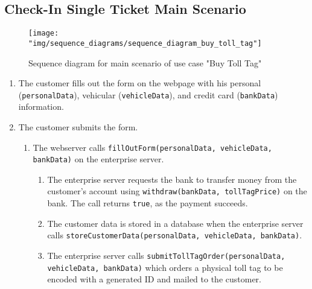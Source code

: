 \subsection{Check-In Single Ticket Main Scenario}

\begin{figure}
\centerline{\texttt{[image: "img/sequence\_diagrams/sequence\_diagram\_buy\_toll\_tag"]}}
\caption{Sequence diagram for main scenario of use case "Buy Toll Tag"}
\label{fig:seq_buy_toll_tag}
\end{figure}

\begin{enumerate}
\item The customer fills out the form on the webpage with his personal (\texttt{personalData}), vehicular (\texttt{vehicleData}), and credit card (\texttt{bankData}) information.
\item The customer submits the form.
	\begin{enumerate}
	\item The webserver calls \texttt{fillOutForm(personalData, vehicleData, bankData)} on the enterprise server.
		\begin{enumerate}
		\item The enterprise server requests the bank to transfer money from the customer's account using \texttt{withdraw(bankData, tollTagPrice)} on the bank. The call returns \texttt{true}, as the payment succeeds.
		\item The customer data is stored in a database when the enterprise server calls \texttt{storeCustomerData(personalData, vehicleData, bankData)}.
		\item The enterprise server calls \texttt{submitTollTagOrder(personalData, vehicleData, bankData)} which orders a physical toll tag to be encoded with a generated ID and mailed to the customer.
		\end{enumerate}
	\end{enumerate}
\end{enumerate}